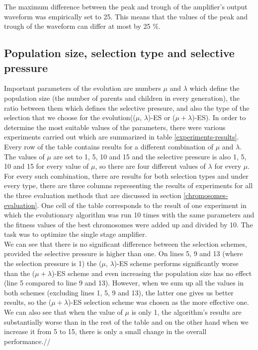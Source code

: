 The maximum difference between the peak and trough of the amplifier's output waveform was empirically set to 25. This means that the values of the peak and trough of the waveform can differ at most by 25 \%.

\subsection{Population size, selection type and selective pressure}
Important parameters of the evolution are numbers $\mu$ and $\lambda$ which define the population size (the number of parents and children in every generation), the ratio between them which defines the selective pressure, and also the type of the selection that we choose for the evolution(($\mu$, $\lambda$)-ES or ($\mu + \lambda$)-ES). In order to determine the most suitable values of the parameters, there were various experiments carried out which are summarized in table \ref{experiments-results}.\\
Every row of the table contains results for a different combination of $\mu$ and $\lambda$. The values of $\mu$ are set to 1, 5, 10 and 15 and the selective pressure is also 1, 5, 10 and 15 for every value of $\mu$, so there are four different values of $\lambda$ for every $\mu$. For every such combination, there are results for both selection types and under every type, there are three columns representing the results of experiments for all the three evaluation methods that are discussed in section \ref{chromosomes-evaluation}. One cell of the table corresponds to the result of one experiment in which the evolutionary algorithm was run 10 times with the same parameters and the fitness values of the best chromosomes were added up and divided by 10. The task was to optimize the single stage amplifier.\\
We can see that there is no significant difference between the selection schemes, provided the selective pressure is higher than one. On lines 5, 9 and 13 (where the selection pressure is 1) the ($\mu$, $\lambda$)-ES scheme performs significantly worse than the ($\mu + \lambda$)-ES scheme and even increasing the population size has no effect (line 5 compared to line 9 and 13). However, when we sum up all the values in both schemes (excluding lines 1, 5, 9 and 13), the latter one gives us better results, so the ($\mu + \lambda$)-ES selection scheme was chosen as the more effective one.\\
We can also see that when the value of $\mu$ is only 1, the algorithm's results are substantially worse than in the rest of the table and on the other hand when we increase it from 5 to 15, there is only a small change in the overall performance.//
